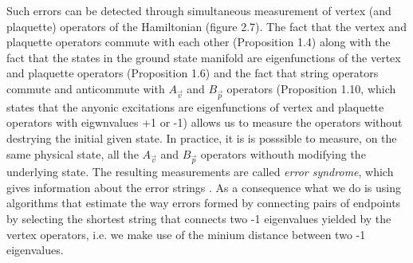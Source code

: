 \documentclass{Configuration_Files/PoliMi3i_thesis}
\begin{document}
Such errors can be detected through  simultaneous measurement of vertex (and plaquette) operators of the Hamiltonian (figure 2.7). The fact that the vertex and plaquette operators commute with each other (Proposition 1.4) along with the fact that the states in the ground state manifold are eigenfunctions of the vertex and plaquette operators (Proposition 1.6) and the fact that string operators commute and anticommute with $A_{\vec{v}}$ and $B_{\vec{p}}$ operators (Proposition 1.10, which states that the anyonic excitations are eigenfunctions of vertex and plaquette operators with eigwnvalues +1 or -1) allows us to measure the operators without destrying the initial given state. In practice, it is is posssible to measure, on the same physical state, all the $A_{\vec{v}}$ and $B_{\vec{p}}$ operators withouth modifying the underlying state. The resulting measurements are called {\it error syndrome}, which gives information about the error strings \cite{Den02}. As a consequence what we do is using algorithms that estimate the way errors formed by connecting pairs of endpoints by selecting the shortest string that connects two -1 eigenvalues yielded by the vertex operators, i.e. we make use of the minium distance between two -1 eigenvalues. \newline
\end{document}
